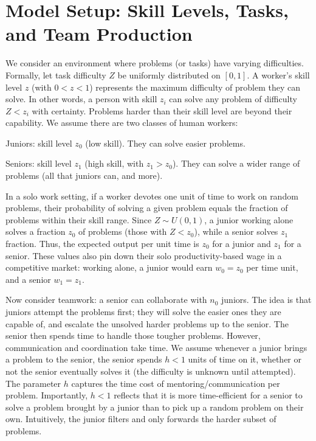 \documentclass[12pt]{article}
\begin{document}
\section{Model Setup: Skill Levels, Tasks, and Team
Production}\label{model-setup-skill-levels-tasks-and-team-production}

We consider an environment where problems (or tasks) have varying
difficulties. Formally, let task difficulty \(Z\) be uniformly
distributed on \([0,1]\). A worker's {skill level} \(z\) (with
\(0<z<1\)) represents the maximum difficulty of problem they can solve.
In other words, a person with skill \(z_i\) can {solve any
problem of difficulty \(Z < z_i\)} with certainty. Problems harder than
their skill level are beyond their capability. We assume there are two
classes of human workers:

{Juniors:} skill level \(z_0\) (low skill). They can solve
easier problems.

{Seniors:} skill level \(z_1\) (high skill, with
\(z_1 > z_0\)). They can solve a wider range of problems (all that
juniors can, and more).

In a {solo work} setting, if a worker devotes one unit of time to
work on random problems, their probability of solving a given problem
equals the fraction of problems within their skill range. Since
\(Z \sim U(0,1)\), a junior working alone solves a fraction \(z_0\) of
problems (those with \(Z < z_0\)), while a senior solves \(z_1\)
fraction. Thus, the {expected output per unit time} is \(z_0\)
for a junior and \(z_1\) for a senior. These values also pin down their
{solo productivity-based wage} in a competitive market: working
alone, a junior would earn \(w_0 = z_0\) per time unit, and a senior
\(w_1 = z_1\).

Now consider {teamwork:} a senior can collaborate with \(n_0\)
juniors. The idea is that juniors attempt the problems first; they will
solve the easier ones they are capable of, and {escalate the
unsolved harder problems up to the senior}. The senior then spends time
to handle those tougher problems. However, communication and
coordination take time. We assume {whenever a junior brings a
problem to the senior, the senior spends \(h < 1\) units of time on it},
whether or not the senior eventually solves it (the difficulty is
unknown until attempted). The parameter \(h\) captures the {time
cost of mentoring/communication per problem}. Importantly, \(h<1\)
reflects that it is more {time-efficient for a senior to solve a
problem brought by a junior} than to pick up a random problem on their
own. Intuitively, the junior filters and only forwards the harder subset
of problems.
\end{document}

